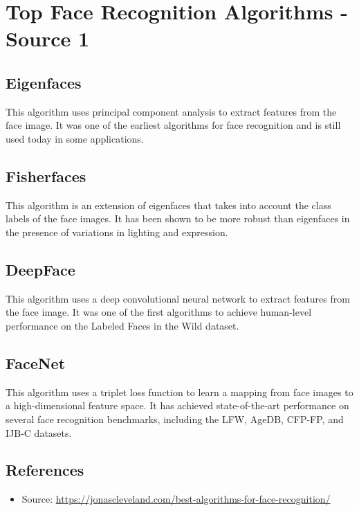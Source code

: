 \documentclass[11pt]{article}
\begin{document}
\tableofcontents
\thispagestyle{empty}
\clearpage

\setcounter{page}{1}

\section{Top Face Recognition Algorithms - Source 1}

\subsection{Eigenfaces}
This algorithm uses principal component analysis to extract features from the face image. It was one of the earliest algorithms for face recognition and is still used today in some applications.

\subsection{Fisherfaces}
This algorithm is an extension of eigenfaces that takes into account the class labels of the face images. It has been shown to be more robust than eigenfaces in the presence of variations in lighting and expression.

\subsection{DeepFace}
This algorithm uses a deep convolutional neural network to extract features from the face image. It was one of the first algorithms to achieve human-level performance on the Labeled Faces in the Wild dataset.

\subsection{FaceNet}
This algorithm uses a triplet loss function to learn a mapping from face images to a high-dimensional feature space. It has achieved state-of-the-art performance on several face recognition benchmarks, including the LFW, AgeDB, CFP-FP, and IJB-C datasets.

\subsection{References}
\begin{itemize}
    \item Source: \url{https://jonascleveland.com/best-algorithms-for-face-recognition/}
\end{itemize}
\end{document}
